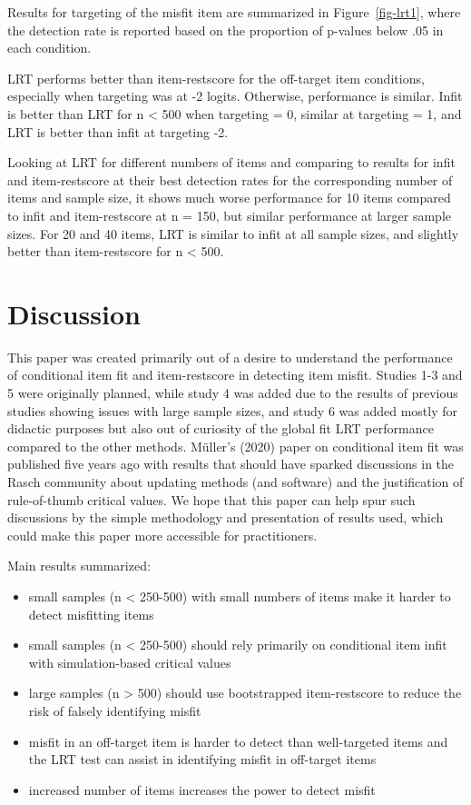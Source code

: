 \documentclass[
  letterpaper,
  DIV=11,
  numbers=noendperiod]{scrartcl}
\providecommand{\tightlist}{%
  \setlength{\itemsep}{0pt}\setlength{\parskip}{0pt}}\usepackage{longtable,booktabs,array}
\begin{document}
Results for targeting of the misfit item are summarized in
Figure~\ref{fig-lrt1}, where the detection rate is reported based on the
proportion of p-values below .05 in each condition.

LRT performs better than item-restscore for the off-target item
conditions, especially when targeting was at -2 logits. Otherwise,
performance is similar. Infit is better than LRT for n \textless{} 500
when targeting = 0, similar at targeting = 1, and LRT is better than
infit at targeting -2.

Looking at LRT for different numbers of items and comparing to results
for infit and item-restscore at their best detection rates for the
corresponding number of items and sample size, it shows much worse
performance for 10 items compared to infit and item-restscore at n =
150, but similar performance at larger sample sizes. For 20 and 40
items, LRT is similar to infit at all sample sizes, and slightly better
than item-restscore for n \textless{} 500.

\section{Discussion}\label{discussion}

This paper was created primarily out of a desire to understand the
performance of conditional item fit and item-restscore in detecting item
misfit. Studies 1-3 and 5 were originally planned, while study 4 was
added due to the results of previous studies showing issues with large
sample sizes, and study 6 was added mostly for didactic purposes but
also out of curiosity of the global fit LRT performance compared to the
other methods. Müller's (2020) paper on conditional item fit was
published five years ago with results that should have sparked
discussions in the Rasch community about updating methods (and software)
and the justification of rule-of-thumb critical values. We hope that
this paper can help spur such discussions by the simple methodology and
presentation of results used, which could make this paper more
accessible for practitioners.

Main results summarized:

\begin{itemize}
\tightlist
\item
  small samples (n \textless{} 250-500) with small numbers of items make
  it harder to detect misfitting items
\item
  small samples (n \textless{} 250-500) should rely primarily on
  conditional item infit with simulation-based critical values
\item
  large samples (n \textgreater{} 500) should use bootstrapped
  item-restscore to reduce the risk of falsely identifying misfit
\item
  misfit in an off-target item is harder to detect than well-targeted
  items and the LRT test can assist in identifying misfit in off-target
  items
\item
  increased number of items increases the power to detect misfit
\end{itemize}
\end{document}
